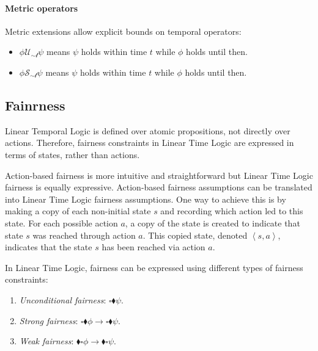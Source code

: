 \paragraph*{Metric operators}
Metric extensions allow explicit bounds on temporal operators:
\begin{itemize}
    \item $\phi\mathcal{U_{\sim t}}\psi$ means $\psi$ holds within time $t$ while $\phi$ holds until then.
    \item $\phi\mathcal{S_{\sim t}}\psi$ means $\psi$ holds within time $t$ while $\phi$ holds until then.
\end{itemize}

\subsection{Fainrness}
Linear Temporal Logic is defined over atomic propositions, not directly over actions.
Therefore, fairness constraints in Linear Time Logic are expressed in terms of states, rather than actions.

Action-based fairness is more intuitive and straightforward but Linear Time Logic fairness is equally expressive.
Action-based fairness assumptions can be translated into Linear Time Logic fairness assumptions.
One way to achieve this is by making a copy of each non-initial state $s$ and recording which action led to this state. 
For each possible action $a$, a copy of the state is created to indicate that state $s$ was reached through action $a$. 
This copied state, denoted $\left\langle s,a\right\rangle$, indicates that the state $s$ has been reached via action $a$.

In Linear Time Logic, fairness can be expressed using different types of fairness constraints:
\begin{enumerate}
    \item \textit{Unconditional fairness}: $\square\blacklozenge\psi$. 
    \item \textit{Strong fairness}: $\square\blacklozenge\phi\rightarrow\square\blacklozenge\psi$.
    \item \textit{Weak fairness}: $\blacklozenge\square\phi\rightarrow\blacklozenge\square\psi$.
\end{enumerate}

